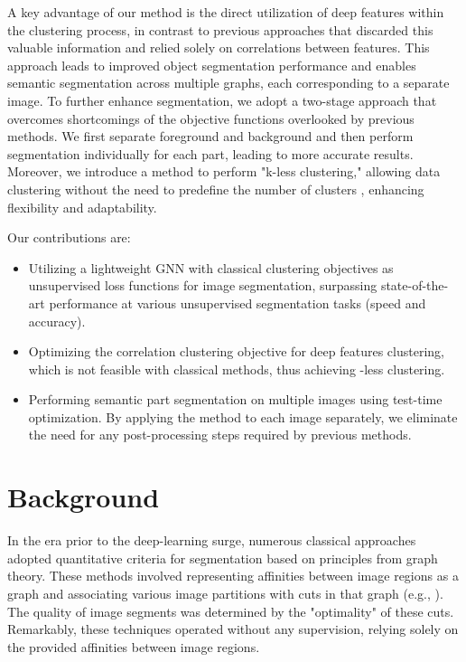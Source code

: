 \documentclass[10pt,twocolumn,letterpaper]{article}
\begin{document}
A key advantage of our method is the direct utilization of deep features within the clustering process, in contrast to previous approaches \cite{melas2022deep, wang2022self} that discarded this valuable information and relied solely on correlations between features. This approach leads to improved object segmentation performance and enables semantic segmentation across multiple graphs, each corresponding to a separate image.
To further enhance segmentation, we adopt a two-stage approach that overcomes shortcomings of the objective functions overlooked by previous methods. We first separate foreground and background and then perform segmentation individually for each part, leading to more accurate results.
Moreover, we introduce a method to perform "k-less clustering," allowing data clustering without the need to predefine the number of clusters , enhancing flexibility and adaptability.

\noindent{}Our contributions are:
\begin{itemize}[leftmargin=*]
\item Utilizing a lightweight GNN with classical clustering objectives as unsupervised loss functions for image segmentation, surpassing state-of-the-art performance at various unsupervised segmentation tasks (speed and accuracy).

\item[] Optimizing the correlation clustering objective for deep features clustering, which is not feasible with classical methods, thus achieving -less clustering.

\item[] Performing semantic part segmentation on multiple images using test-time optimization. By applying the method to each image separately, we eliminate the need for any post-processing steps required by previous methods.
\end{itemize}



\section{Background}
In the era prior to the deep-learning surge, numerous classical approaches adopted quantitative criteria for segmentation based on principles from graph theory. These methods involved representing affinities between image regions as a graph and associating various image partitions with cuts in that graph (e.g., \cite{shi2000normalized, bansal2004correlation, bagon2011large}). The quality of image segments was determined by the "optimality" of these cuts. Remarkably, these techniques operated without any supervision, relying solely on the provided affinities between image regions.
\end{document}
